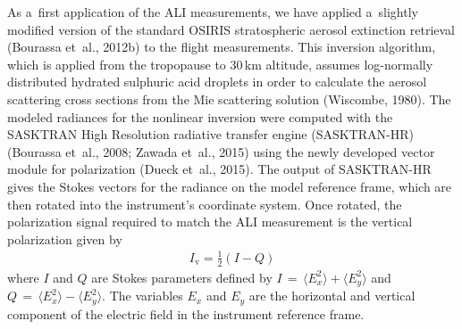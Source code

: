 \documentclass[amtd, online, hvmath]{copernicus}
\begin{document}
As a~first application of the ALI measurements, we have applied
a~slightly modified version of the standard OSIRIS stratospheric
aerosol extinction retrieval (Bourassa et~al., 2012b) to the flight
measurements. This inversion algorithm, which is applied from the
tropopause to 30\,\unit{km} altitude, assumes log-normally distributed
hydrated sulphuric acid droplets in order to calculate the aerosol
scattering cross sections from the Mie scattering solution (Wiscombe,
1980). The modeled radiances for the nonlinear inversion were computed
with the SASKTRAN High Resolution radiative transfer engine
(SASKTRAN-HR) (Bourassa et~al., 2008; Zawada et~al., 2015) using the
newly developed vector module for polarization (Dueck et~al.,
2015). The output of SASKTRAN-HR gives the Stokes vectors for the
radiance on the model reference frame, which are then rotated into the
instrument's coordinate system. Once rotated, the polarization signal
required to match the ALI measurement is the vertical polarization
given by
\begin{align}
I_{\mathrm{v}}=\frac{1}{2}\left(I-Q \right)
\end{align}
where $I$ and $Q$ are Stokes parameters defined by $I\,=\,\langle
E_x^2\rangle + \langle E_y^2\rangle$ and $Q\,=\,\langle E_x^2\rangle -
\langle E_y^2\rangle$. The variables $E_{x}$ and $E_{y}$ are the
horizontal and vertical component of the electric field in the
instrument reference frame.
\end{document}
